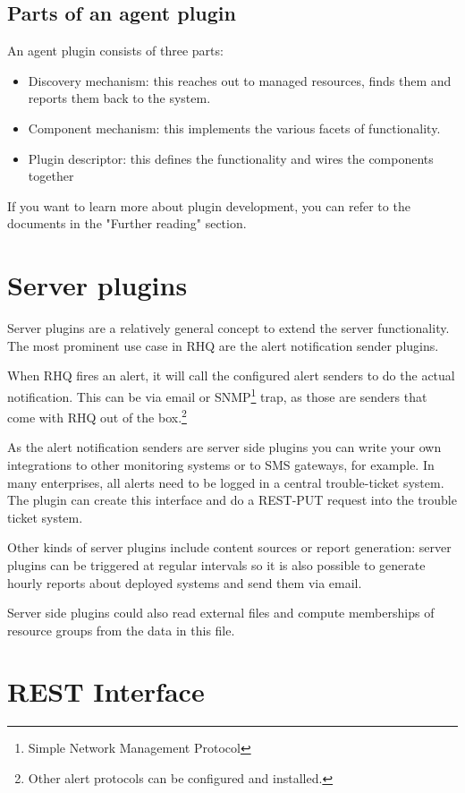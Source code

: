 \documentclass[twocolumn,10pt,a4paper]{article}
\begin{document}
\subsection{Parts of an agent plugin}

An agent plugin consists of three parts:
\begin{itemize}
\item Discovery mechanism: this reaches out to managed resources, finds them and reports them back to the system.
\item Component mechanism: this implements the various facets of functionality.
\item Plugin descriptor: this defines the functionality and wires the components together
\end{itemize}

If you want to learn more about plugin development, you can refer to the documents in the "Further reading" section.

\section{Server plugins}

Server plugins are a relatively general concept to extend the server functionality. The most prominent use case in RHQ are the alert notification sender plugins. 

When RHQ fires an alert, it will call the configured alert senders to do the actual notification. This can be via email or SNMP\footnote{Simple Network Management Protocol} trap, as those are senders that come with RHQ out of the box.\footnote{Other alert protocols can be configured and installed.}

As the alert notification senders are server side plugins you can write your own integrations to other monitoring systems or to SMS gateways, for example. In many enterprises, all alerts need to be logged in a central trouble-ticket system. The plugin can create this interface and do a REST-PUT request into the trouble ticket system.

Other kinds of server plugins include content sources or report generation: server plugins can be triggered at regular intervals so it is also possible to generate hourly reports about deployed systems and send them via email. 

Server side plugins could also read external files and compute memberships of resource groups from the data in this file.

\section{REST Interface}
\end{document}
